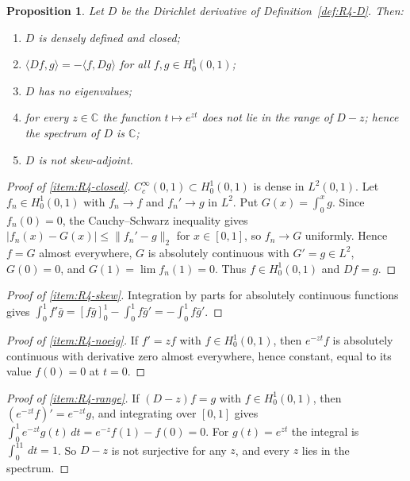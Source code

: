 \documentclass[11pt]{amsart}
\theoremstyle{plain}
\newtheorem{proposition}[theorem]{Proposition}
\theoremstyle{definition}
\theoremstyle{remark}
\numberwithin{equation}{section}
\newcommand{\C}{\mathbb{C}}
\begin{document}
\begin{proposition}\label{prop:R4}
Let $D$ be the Dirichlet derivative of Definition~\ref{def:R4-D}. Then:
\begin{enumerate}[label=(\roman*)]
\item\label{item:R4-closed} $D$ is densely defined and closed;
\item\label{item:R4-skew} $\langle Df,g\rangle=-\langle f,Dg\rangle$
  for all $f,g\in H^1_0(0,1)$;
\item\label{item:R4-noeig} $D$ has no eigenvalues;
\item\label{item:R4-range} for every $z\in\C$ the function
  $t\mapsto e^{zt}$ does not lie in the range of $D-z$; hence the
  spectrum of $D$ is $\C$;
\item\label{item:R4-notskew} $D$ is not skew-adjoint.
\end{enumerate}
\end{proposition}

\begin{proof}[Proof of \ref{item:R4-closed}]
$C_c^\infty(0,1)\subset H^1_0(0,1)$ is dense in $L^2(0,1)$. Let
$f_n\in H^1_0(0,1)$ with $f_n\to f$ and $f_n'\to g$ in $L^2$. Put
$G(x)=\int_0^xg$. Since $f_n(0)=0$, the Cauchy--Schwarz inequality gives
$|f_n(x)-G(x)|\le\|f_n'-g\|_2$ for $x\in[0,1]$, so $f_n\to G$
uniformly. Hence $f=G$ almost everywhere, $G$ is absolutely continuous
with $G'=g\in L^2$, $G(0)=0$, and $G(1)=\lim f_n(1)=0$. Thus $f\in
H^1_0(0,1)$ and $Df=g$.
\end{proof}

\begin{proof}[Proof of \ref{item:R4-skew}]
Integration by parts for absolutely continuous functions gives
$\int_0^1f'\bar g=[f\bar g]_0^1-\int_0^1f\bar g'=-\int_0^1f\bar g'$.
\end{proof}

\begin{proof}[Proof of \ref{item:R4-noeig}]
If $f'=zf$ with $f\in H^1_0(0,1)$, then $e^{-zt}f$ is absolutely
continuous with derivative zero almost everywhere, hence constant, equal
to its value $f(0)=0$ at $t=0$.
\end{proof}

\begin{proof}[Proof of \ref{item:R4-range}]
If $(D-z)f=g$ with $f\in H^1_0(0,1)$, then $(e^{-zt}f)'=e^{-zt}g$, and
integrating over $[0,1]$ gives
$\int_0^1e^{-zt}g(t)\,dt=e^{-z}f(1)-f(0)=0$. For $g(t)=e^{zt}$ the integral is
$\int_0^11\,dt=1$. So $D-z$ is not surjective for any $z$, and every
$z$ lies in the spectrum.
\end{proof}
\end{document}
